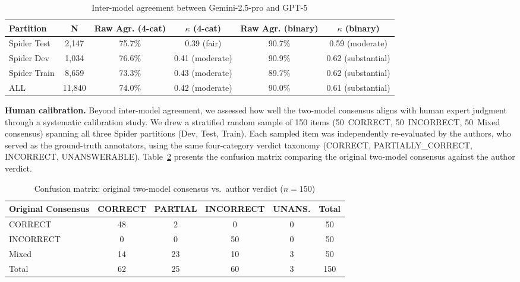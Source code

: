 \documentclass[print]{einformatica}
\begin{document}
\begin{table}[ht]
    \caption{Inter-model agreement between Gemini-2.5-pro and GPT-5}
    \label{tab:kappa}
    \centering
    \footnotesize
    \begin{tabular}{lccccc}
        \toprule
        \textbf{Partition} & \textbf{N} & \textbf{Raw Agr. (4-cat)} & \textbf{$\kappa$ (4-cat)} & \textbf{Raw Agr. (binary)} & \textbf{$\kappa$ (binary)} \\
        \midrule
        Spider Test  & 2,147  & 75.7\% & 0.39 (fair)        & 90.7\% & 0.59 (moderate) \\
        Spider Dev   & 1,034  & 76.6\% & 0.41 (moderate)    & 90.9\% & 0.62 (substantial) \\
        Spider Train & 8,659  & 73.3\% & 0.43 (moderate)    & 89.7\% & 0.62 (substantial) \\
        \midrule
        ALL          & 11,840 & 74.0\% & 0.42 (moderate)    & 90.0\% & 0.61 (substantial) \\
        \bottomrule
    \end{tabular}
\end{table}

\textbf{Human calibration.}\label{sec:calibration} Beyond inter-model agreement, we assessed how well the two-model consensus aligns with human expert judgment through a systematic calibration study. We drew a stratified random sample of 150 items (50~CORRECT, 50~INCORRECT, 50~Mixed consensus) spanning all three Spider partitions (Dev, Test, Train). Each sampled item was independently re-evaluated by the authors, who served as the ground-truth annotators, using the same four-category verdict taxonomy (CORRECT, PARTIALLY\_CORRECT, INCORRECT, UNANSWERABLE). Table~\ref{tab:calibration} presents the confusion matrix comparing the original two-model consensus against the author verdict.

\begin{table}[ht]
    \caption{Confusion matrix: original two-model consensus vs.\ author verdict ($n=150$)}
    \label{tab:calibration}
    \centering
    \footnotesize
    \begin{tabular}{lccccc}
        \toprule
        \textbf{Original Consensus} & \textbf{CORRECT} & \textbf{PARTIAL} & \textbf{INCORRECT} & \textbf{UNANS.} & \textbf{Total} \\
        \midrule
        CORRECT          & 48 & 2  & 0  & 0 & 50 \\
        INCORRECT        & 0  & 0  & 50 & 0 & 50 \\
        Mixed            & 14 & 23 & 10 & 3 & 50 \\
        \midrule
        Total            & 62 & 25 & 60 & 3 & 150 \\
        \bottomrule
    \end{tabular}
\end{table}
\end{document}
